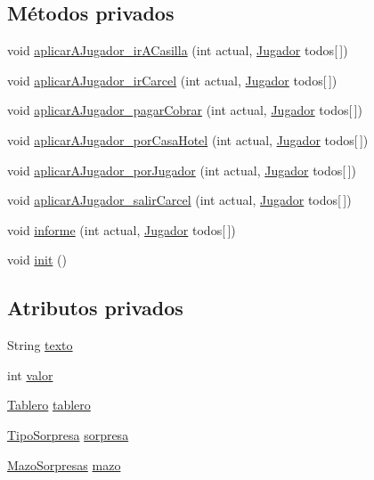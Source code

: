 \subsection*{Métodos privados}
\begin{DoxyCompactItemize}
\item 
void \hyperlink{classcivitas_1_1Sorpresa_a4ff8261c67fb8ee584c6519fb2780354}{aplicar\+A\+Jugador\+\_\+ir\+A\+Casilla} (int actual, \hyperlink{classcivitas_1_1Jugador}{Jugador} todos\mbox{[}$\,$\mbox{]})
\item 
void \hyperlink{classcivitas_1_1Sorpresa_a4bff9e94488f91f80b9d57bfb268669a}{aplicar\+A\+Jugador\+\_\+ir\+Carcel} (int actual, \hyperlink{classcivitas_1_1Jugador}{Jugador} todos\mbox{[}$\,$\mbox{]})
\item 
void \hyperlink{classcivitas_1_1Sorpresa_a2f0e2f67d53962c7aa71c4d8cddce5a6}{aplicar\+A\+Jugador\+\_\+pagar\+Cobrar} (int actual, \hyperlink{classcivitas_1_1Jugador}{Jugador} todos\mbox{[}$\,$\mbox{]})
\item 
void \hyperlink{classcivitas_1_1Sorpresa_a5f754dc853619e2aade301acda290784}{aplicar\+A\+Jugador\+\_\+por\+Casa\+Hotel} (int actual, \hyperlink{classcivitas_1_1Jugador}{Jugador} todos\mbox{[}$\,$\mbox{]})
\item 
void \hyperlink{classcivitas_1_1Sorpresa_ac1c1770b07805390c5d7486f6f1285d9}{aplicar\+A\+Jugador\+\_\+por\+Jugador} (int actual, \hyperlink{classcivitas_1_1Jugador}{Jugador} todos\mbox{[}$\,$\mbox{]})
\item 
void \hyperlink{classcivitas_1_1Sorpresa_aa51f171294077ccba991f03fae016a62}{aplicar\+A\+Jugador\+\_\+salir\+Carcel} (int actual, \hyperlink{classcivitas_1_1Jugador}{Jugador} todos\mbox{[}$\,$\mbox{]})
\item 
void \hyperlink{classcivitas_1_1Sorpresa_ae375d66b0f74795268b881d852b0f90f}{informe} (int actual, \hyperlink{classcivitas_1_1Jugador}{Jugador} todos\mbox{[}$\,$\mbox{]})
\item 
void \hyperlink{classcivitas_1_1Sorpresa_a84bd6659e667747df646da45a3467cd5}{init} ()
\end{DoxyCompactItemize}
\subsection*{Atributos privados}
\begin{DoxyCompactItemize}
\item 
String \hyperlink{classcivitas_1_1Sorpresa_aa7f34d4a47ca2e53f96a060aed7b6c4f}{texto}
\item 
int \hyperlink{classcivitas_1_1Sorpresa_a7c1df71c9d226e14c75ec8ec66592485}{valor}
\item 
\hyperlink{classcivitas_1_1Tablero}{Tablero} \hyperlink{classcivitas_1_1Sorpresa_a843272761fd69ecf32682bf3f6060add}{tablero}
\item 
\hyperlink{enumcivitas_1_1TipoSorpresa}{Tipo\+Sorpresa} \hyperlink{classcivitas_1_1Sorpresa_acda3eee006c2731ae4f062b05ffe36ab}{sorpresa}
\item 
\hyperlink{classcivitas_1_1MazoSorpresas}{Mazo\+Sorpresas} \hyperlink{classcivitas_1_1Sorpresa_a3a0aae5184087ccd5a07391a2d5d0e78}{mazo}
\end{DoxyCompactItemize}


